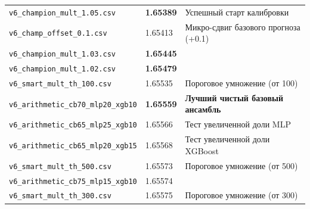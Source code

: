 \documentclass[12pt, a4paper]{article}
\newcommand{\rmsleGood}[1]{\textbf{\color{success}#1}}
\newcommand{\rmsleNeutral}[1]{\textbf{\color{primary}#1}}
\begin{document}
\begin{table}[H]
\begin{tabular}{l l p{7cm}}
			\texttt{v6\_champion\_mult\_1.05.csv} & \rmsleGood{1.65389} & Успешный старт калибровки \\
			\texttt{v6\_champ\_offset\_0.1.csv} & 1.65413 & Микро-сдвиг базового прогноза (+0.1) \\
			\texttt{v6\_champion\_mult\_1.03.csv} & \rmsleGood{1.65445} & \\
			\texttt{v6\_champion\_mult\_1.02.csv} & \rmsleGood{1.65479} & \\
			\texttt{v6\_smart\_mult\_th\_100.csv} & 1.65535 & Пороговое умножение (от 100) \\
			\texttt{v6\_arithmetic\_cb70\_mlp20\_xgb10} & \rmsleNeutral{1.65559} & \textbf{Лучший чистый базовый ансамбль} \\
			\texttt{v6\_arithmetic\_cb65\_mlp25\_xgb10} & 1.65566 & Тест увеличенной доли MLP \\
			\texttt{v6\_arithmetic\_cb65\_mlp20\_xgb15} & 1.65568 & Тест увеличенной доли XGBoost \\
			\texttt{v6\_smart\_mult\_th\_500.csv} & 1.65573 & Пороговое умножение (от 500) \\
			\texttt{v6\_arithmetic\_cb75\_mlp15\_xgb10} & 1.65574 & \\
			\texttt{v6\_smart\_mult\_th\_300.csv} & 1.65575 & Пороговое умножение (от 300) \\
			\bottomrule
		\end{tabular}
	\end{table}
	
\end{document}
